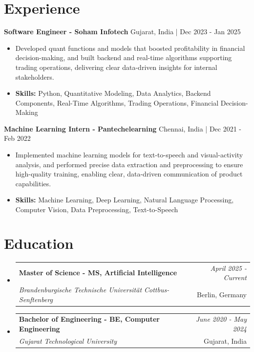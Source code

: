 \documentclass[a4paper,11pt]{article}
\makeatletter
\newcommand{\resumeSubheading}[4]{
\vspace{0.5mm}\item
    \begin{tabular*}{0.98\textwidth}[t]{l@{\extracolsep{\fill}}r}
        \textbf{#1} & \textit{\footnotesize{#4}} \\
        \textit{\footnotesize{#3}} &  \footnotesize{#2}\\
    \end{tabular*}
    \vspace{-2.4mm}
}
\makeatother
\begin{document}
\section{\textbf{Experience}}


\vspace{1mm}
  \textbf{Software Engineer - Soham Infotech} \hfill Gujarat, India | Dec 2023 - Jan 2025
\vspace{-1.5mm} %
\begin{itemize}
  \item Developed quant functions and models that boosted profitability in financial decision-making, and built backend and real-time algorithms supporting trading operations, delivering clear data-driven insights for internal stakeholders.

\vspace{-2mm}
  \item \textbf{Skills:} Python, Quantitative Modeling, Data Analytics, Backend Components, Real-Time Algorithms, Trading Operations, Financial Decision-Making
\end{itemize}

\vspace{1mm}
  \textbf{Machine Learning Intern - Pantechelearning} \hfill Chennai, India | Dec 2021 - Feb 2022
\vspace{-1.5mm} %
\begin{itemize}
  \item Implemented machine learning models for text-to-speech and visual-activity analysis, and performed precise data extraction and preprocessing to ensure high-quality training, enabling clear, data-driven communication of product capabilities.
\vspace{-2mm}
  \item \textbf{Skills:} Machine Learning, Deep Learning, Natural Language Processing, Computer Vision, Data Preprocessing, Text-to-Speech
\end{itemize}\section{\textbf{Education}}
\vspace{-0.4mm}

\begin{itemize}
\resumeSubheading
{Master of Science - MS, Artificial Intelligence }{Berlin, Germany}
{Brandenburgische Technische Universität Cottbus-Senftenberg  }{April 2025 - Current}

\vspace{1.0mm} %
\resumeSubheading
{Bachelor of Engineering - BE, Computer Engineering  }{Gujarat, India}
{Gujarat Technological University }{June 2020 - May 2024}

\end{itemize}
\end{document}
